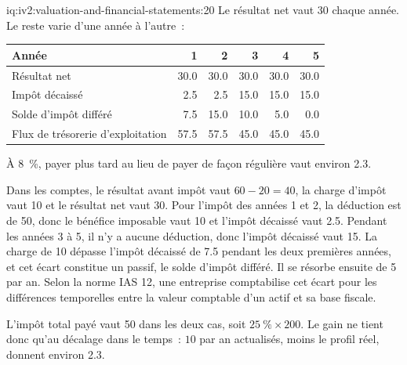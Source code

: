 \begin{solution}{iq:iv2:valuation-and-financial-statements:20}
Le résultat net vaut 30 chaque année. Le reste varie d'une année à l'autre~:
\begin{center}\small
\begin{tabular}{@{}lrrrrr@{}}
Année & 1 & 2 & 3 & 4 & 5 \\ \hline
Résultat net & 30.0 & 30.0 & 30.0 & 30.0 & 30.0 \\
Impôt décaissé & 2.5 & 2.5 & 15.0 & 15.0 & 15.0 \\
Solde d'impôt différé & 7.5 & 15.0 & 10.0 & 5.0 & 0.0 \\
Flux de trésorerie d'exploitation & 57.5 & 57.5 & 45.0 & 45.0 & 45.0
\end{tabular}
\end{center}
À 8~\%, payer plus tard au lieu de payer de façon régulière vaut environ 2.3.

Dans les comptes, le résultat avant impôt vaut $60 - 20 = 40$, la charge d'impôt vaut 10 et le résultat net vaut 30. Pour l'impôt des années 1 et 2, la déduction est de 50, donc le bénéfice imposable vaut 10 et l'impôt décaissé vaut 2.5. Pendant les années 3 à 5, il n'y a aucune déduction, donc l'impôt décaissé vaut 15. La charge de 10 dépasse l'impôt décaissé de 7.5 pendant les deux premières années, et cet écart constitue un passif, le solde d'impôt différé. Il se résorbe ensuite de 5 par an. Selon la norme IAS 12, une entreprise comptabilise cet écart pour les différences temporelles entre la valeur comptable d'un actif et sa base fiscale.

L'impôt total payé vaut 50 dans les deux cas, soit $25~\% \times 200$. Le gain ne tient donc qu'au décalage dans le temps~: $10$ par an actualisés, moins le profil réel, donnent environ 2.3.

\end{solution}

